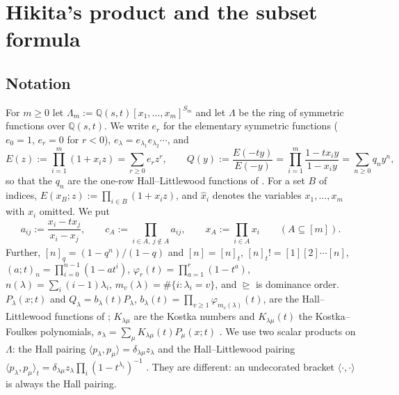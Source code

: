 \documentclass[11pt]{amsart}
\theoremstyle{definition}
\theoremstyle{remark}
\numberwithin{equation}{section}
\newcommand{\Lam}{\Lambda}
\newcommand{\hx}{\hat x}
\begin{document}
\section{Hikita's product and the subset formula}\label{sec:hikita}

\subsection{Notation}
For $m\ge0$ let $\Lam_m:=\mathbb{Q}(s,t)[x_1,\dots,x_m]^{S_m}$ and let $\Lam$ be the ring of symmetric functions over $\mathbb{Q}(s,t)$. We write $e_r$ for the elementary symmetric functions ($e_0=1$, $e_r=0$ for $r<0$), $e_\lambda=e_{\lambda_1}e_{\lambda_2}\cdots$, and
\[ E(z):=\prod_{i=1}^m(1+x_iz)=\sum_{r\ge0}e_rz^r,\qquad Q(y):=\frac{E(-ty)}{E(-y)}=\prod_{i=1}^m\frac{1-tx_iy}{1-x_iy}=\sum_{n\ge0}q_ny^n, \]
so that the $q_n$ are the one-row Hall--Littlewood functions of \cite[III (2.10)]{Macdonald95}. For a set $B$ of indices, $E(x_B;z):=\prod_{i\in B}(1+x_iz)$, and $\hx_i$ denotes the variables $x_1,\dots,x_m$ with $x_i$ omitted. We put
\[ a_{ij}:=\frac{x_i-tx_j}{x_i-x_j},\qquad c_A:=\prod_{i\in A,\ j\notin A}a_{ij},\qquad x_A:=\prod_{i\in A}x_i\qquad(A\subseteq[m]). \]
Further, $[n]_q=(1-q^n)/(1-q)$ and $[n]=[n]_t$, $[n]_t!=[1][2]\cdots[n]$, $(a;t)_n=\prod_{i=0}^{n-1}(1-at^i)$, $\varphi_r(t)=\prod_{a=1}^r(1-t^a)$, $n(\lambda)=\sum_i(i-1)\lambda_i$, $m_v(\lambda)=\#\{i:\lambda_i=v\}$, and $\trianglerighteq$ is dominance order. $P_\lambda(x;t)$ and $Q_\lambda=b_\lambda(t)P_\lambda$, $b_\lambda(t)=\prod_{v\ge1}\varphi_{m_v(\lambda)}(t)$, are the Hall--Littlewood functions of \cite[III \S2]{Macdonald95}; $K_{\lambda\mu}$ are the Kostka numbers and $K_{\lambda\mu}(t)$ the Kostka--Foulkes polynomials, $s_\lambda=\sum_\mu K_{\lambda\mu}(t)P_\mu(x;t)$ \cite[III (2.6)]{Macdonald95}. We use two scalar products on $\Lam$: the Hall pairing $\langle p_\lambda,p_\mu\rangle=\delta_{\lambda\mu}z_\lambda$ \cite[I \S4]{Macdonald95} and the Hall--Littlewood pairing $\langle p_\lambda,p_\mu\rangle_t=\delta_{\lambda\mu}z_\lambda\prod_i(1-t^{\lambda_i})^{-1}$ \cite[III \S4]{Macdonald95}. They are different: an undecorated bracket $\langle\cdot,\cdot\rangle$ is always the Hall pairing.
\end{document}
